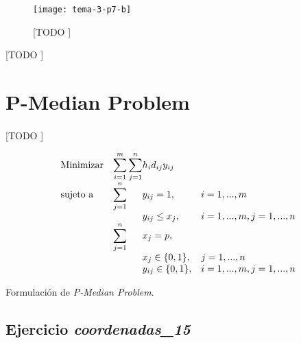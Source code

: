 \documentclass[spanish]{article}
\begin{document}
			\begin{figure}[h]
				\begin{center}
					\texttt{[image: tema-3-p7-b]}
				\end{center}
				\caption{[TODO ]}
				\label{}
			\end{figure}

			\begin{table}[h]
				\begin{center}
				\end{center}
				\caption{[TODO ]}
				\label{}
			\end{table}


	\section{P-Median Problem}
	\label{sec:e-8}

		\paragraph{}
		[TODO ]


		\begin{eqfloat}
			\begin{equation}
				\begin{array}{ll@{}ll}
					\text{Minimizar}
						& \displaystyle\sum\limits_{i = 1}^m
							\displaystyle\sum\limits_{j = 1}^n	& h_i d_{ij} y_{ij}	&							\\
					\text{sujeto a}
						& \displaystyle\sum\limits_{j = 1}^n 	& y_{ij} = 1,		& i = 1,..., m	\\
						& 																	 	& y_{ij} \leq x_{j},  		& i=1 ,..., m,j=1 ,..., n  \\
						& \displaystyle\sum\limits_{j = 1}^n 	& x_{j} = p,  		& 						\\
						&                                     &	x_{j} \in \{0,1\},&j=1 ,..., n 	\\
						&                                     &	y_{ij} \in \{0,1\},&i=1 ,..., m, j=1 ,..., n  \\
				\end{array}
			\end{equation}
			\caption{Formulación de \emph{P-Median Problem}.}
      \label{eq:p_median}
    \end{eqfloat}


		\subsection{Ejercicio \emph{coordenadas\_15}}
		\label{sec:e-8a}
\end{document}
